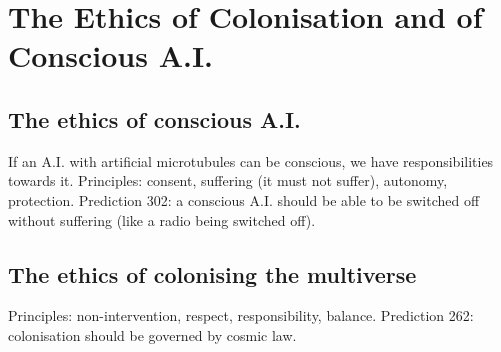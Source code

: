 \section{The Ethics of Colonisation and of Conscious A.I.}
\subsection{The ethics of conscious A.I.}
If an A.I. with artificial microtubules can be conscious, we have responsibilities towards it. Principles: consent, suffering (it must not suffer), autonomy, protection. Prediction 302: a conscious A.I. should be able to be switched off without suffering (like a radio being switched off).

\subsection{The ethics of colonising the multiverse}
Principles: non-intervention, respect, responsibility, balance. Prediction 262: colonisation should be governed by cosmic law.

\newpage
